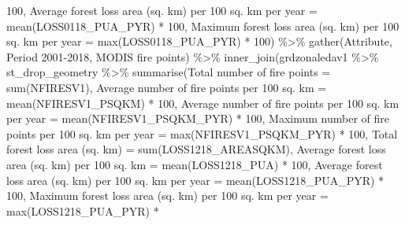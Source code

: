 \documentclass[10pt,landscape,a3paper]{article}
\newenvironment{Shaded}{\begin{snugshade}}{\end{snugshade}}
\newcommand{\AttributeTok}[1]{\textcolor[rgb]{0.77,0.63,0.00}{#1}}
\newcommand{\DecValTok}[1]{\textcolor[rgb]{0.00,0.00,0.81}{#1}}
\newcommand{\FunctionTok}[1]{\textcolor[rgb]{0.00,0.00,0.00}{#1}}
\newcommand{\NormalTok}[1]{#1}
\newcommand{\OtherTok}[1]{\textcolor[rgb]{0.56,0.35,0.01}{#1}}
\newcommand{\SpecialCharTok}[1]{\textcolor[rgb]{0.00,0.00,0.00}{#1}}
\newcommand{\StringTok}[1]{\textcolor[rgb]{0.31,0.60,0.02}{#1}}
\begin{document}
\begin{Shaded}
\begin{Highlighting}[]
        \DecValTok{100}\NormalTok{, }\StringTok{\textasciigrave{}}\AttributeTok{Average forest loss area (sq. km) per 100 sq. km per year}\StringTok{\textasciigrave{}} \OtherTok{=} \FunctionTok{mean}\NormalTok{(LOSS0118\_PUA\_PYR) }\SpecialCharTok{*}
        \DecValTok{100}\NormalTok{, }\StringTok{\textasciigrave{}}\AttributeTok{Maximum forest loss area (sq. km) per 100 sq. km per year}\StringTok{\textasciigrave{}} \OtherTok{=} \FunctionTok{max}\NormalTok{(LOSS0118\_PUA\_PYR) }\SpecialCharTok{*}
        \DecValTok{100}\NormalTok{) }\SpecialCharTok{\%\textgreater{}\%}
    \FunctionTok{gather}\NormalTok{(Attribute, }\StringTok{\textasciigrave{}}\AttributeTok{Period 2001{-}2018, MODIS fire points}\StringTok{\textasciigrave{}}\NormalTok{) }\SpecialCharTok{\%\textgreater{}\%}
    \FunctionTok{inner\_join}\NormalTok{(grdzonaledav1 }\SpecialCharTok{\%\textgreater{}\%}
\NormalTok{        st\_drop\_geometry }\SpecialCharTok{\%\textgreater{}\%}
        \FunctionTok{summarise}\NormalTok{(}\StringTok{\textasciigrave{}}\AttributeTok{Total number of fire points}\StringTok{\textasciigrave{}} \OtherTok{=} \FunctionTok{sum}\NormalTok{(NFIRESV1), }\StringTok{\textasciigrave{}}\AttributeTok{Average number of fire points per 100 sq. km}\StringTok{\textasciigrave{}} \OtherTok{=} \FunctionTok{mean}\NormalTok{(NFIRESV1\_PSQKM) }\SpecialCharTok{*}
            \DecValTok{100}\NormalTok{, }\StringTok{\textasciigrave{}}\AttributeTok{Average number of fire points per 100 sq. km per year}\StringTok{\textasciigrave{}} \OtherTok{=} \FunctionTok{mean}\NormalTok{(NFIRESV1\_PSQKM\_PYR) }\SpecialCharTok{*}
            \DecValTok{100}\NormalTok{, }\StringTok{\textasciigrave{}}\AttributeTok{Maximum number of fire points per 100 sq. km per year}\StringTok{\textasciigrave{}} \OtherTok{=} \FunctionTok{max}\NormalTok{(NFIRESV1\_PSQKM\_PYR) }\SpecialCharTok{*}
            \DecValTok{100}\NormalTok{, }\StringTok{\textasciigrave{}}\AttributeTok{Total forest loss area (sq. km)}\StringTok{\textasciigrave{}} \OtherTok{=} \FunctionTok{sum}\NormalTok{(LOSS1218\_AREASQKM), }\StringTok{\textasciigrave{}}\AttributeTok{Average forest loss area (sq. km) per 100 sq. km}\StringTok{\textasciigrave{}} \OtherTok{=} \FunctionTok{mean}\NormalTok{(LOSS1218\_PUA) }\SpecialCharTok{*}
            \DecValTok{100}\NormalTok{, }\StringTok{\textasciigrave{}}\AttributeTok{Average forest loss area (sq. km) per 100 sq. km per year}\StringTok{\textasciigrave{}} \OtherTok{=} \FunctionTok{mean}\NormalTok{(LOSS1218\_PUA\_PYR) }\SpecialCharTok{*}
            \DecValTok{100}\NormalTok{, }\StringTok{\textasciigrave{}}\AttributeTok{Maximum forest loss area (sq. km) per 100 sq. km per year}\StringTok{\textasciigrave{}} \OtherTok{=} \FunctionTok{max}\NormalTok{(LOSS1218\_PUA\_PYR) }\SpecialCharTok{*}

\end{Highlighting}
\end{Shaded}
\end{document}
